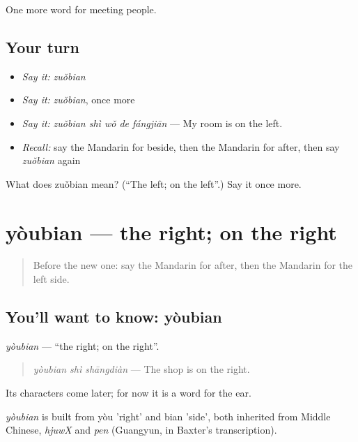 \begin{grammarlens}[title={What you've built}]
One more word for meeting people.
\end{grammarlens}

\subsection*{Your turn}
\begin{itemize}
\raggedright
  \item \emph{Say it:} \emph{zuǒbian}
  \item \emph{Say it:} \emph{zuǒbian}, once more
  \item \emph{Say it:} \emph{zuǒbian shì wǒ de fángjiān} — My room is on the left.
  \item \emph{Recall:} say the Mandarin for beside, then the Mandarin for after, then say \emph{zuǒbian} again
\end{itemize}

\begin{tcolorbox}[breakable,colback=teal!4,colframe=teal!35!black,title={Before you move on}]
What does zuǒbian mean? (\textquotedblleft{}The left; on the left\textquotedblright{}.) Say it once more.
\end{tcolorbox}
\section[yòubian]{yòubian — the right; on the right}

\label{lesson:ZH-C82-youbian}



\begin{quote}
Before the new one: say the Mandarin for after, then the Mandarin for the left side.
\end{quote}

\subsection*{You'll want to know: yòubian}
\emph{yòubian} — \textquotedblleft{}the right; on the right\textquotedblright{}.

\begin{quote}
\emph{yòubian shì shāngdiàn} — The shop is on the right.
\end{quote}

Its characters come later; for now it is a word for the ear.

\begin{cousinweb}
\emph{yòubian} is built from yòu 'right' and bian 'side', both inherited from Middle Chinese, \emph{hjuwX} and \emph{pen} (Guangyun, in Baxter's transcription).
\end{cousinweb}


